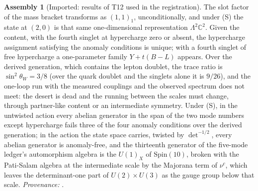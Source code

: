 \documentclass[11pt]{article}
\theoremstyle{definition}
\newtheorem{assembled}[theorem]{Assembly}
\theoremstyle{plain}
\providecommand{\C}{}\renewcommand{\C}{\mathbb{C}}
\begin{document}
\begin{assembled}[Imported: results of T12 used in the registration]\label{c:rungs.imported-results-t12-used-registration}
The slot factor of the mass bracket transforms as $(1,1)_{1}$, unconditionally, and under (S) the state at $(2,0)$ is that same one-dimensional representation $\Lambda^{2}\C^{2}$. Given the content, with the fourth singlet at hypercharge zero or absent, the hypercharge assignment satisfying the anomaly conditions is unique; with a fourth singlet of free hypercharge a one-parameter family $Y + t(B - L)$ appears. Over the derived generation, which contains the lepton doublet, the trace ratio is $\sin^{2}\theta_{W} = 3/8$ (over the quark doublet and the singlets alone it is $9/26$), and the one-loop run with the measured couplings and the observed spectrum does not meet: the desert is dead and the running between the scales must change, through partner-like content or an intermediate symmetry. Under (S), in the untwisted action every abelian generator in the span of the two mode numbers except hypercharge fails three of the four anomaly conditions over the derived generation; in the action the state space carries, twisted by $\det^{-1/2}$, every abelian generator is anomaly-free, and the thirteenth generator of the five-mode ledger's automorphism algebra is the $U(1)_{X}$ of $\mathrm{Spin}(10)$, broken with the Pati-Salam algebra at the intermediate scale by the Majorana term of $\nu^{c}$, which leaves the determinant-one part of $U(2) \times U(3)$ as the gauge group below that scale. \emph{Provenance:} \cite[Prop.~3.2, Prop.~5.8(1), (3), Thm.~5.5(3), Props.~6.1, 6.2, 10.7]{ButlerT12}.
\end{assembled}
\end{document}
